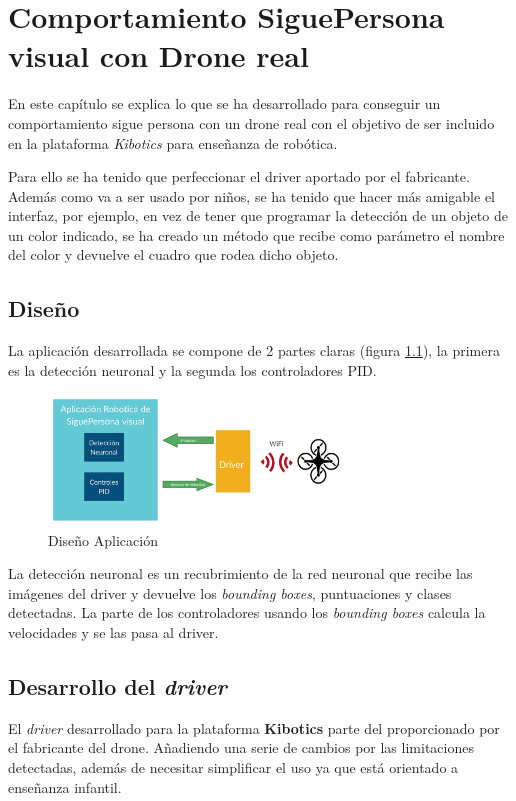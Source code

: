 \chapter{Comportamiento SiguePersona visual con Drone real}\label{cap.real}
En este capítulo se explica lo que se ha desarrollado para conseguir un comportamiento sigue persona con un drone real con el objetivo de ser incluido en la plataforma \textit{Kibotics} para enseñanza de robótica.

Para ello se ha tenido que perfeccionar el driver aportado por el fabricante\cite{tellodriver}. Además como va a ser usado por niños, se ha tenido que hacer más amigable el interfaz, por ejemplo, en vez de tener que programar la detección de un objeto de un color indicado, se ha creado un método que recibe como parámetro el nombre del color y devuelve el cuadro que rodea dicho objeto.

\section{Diseño}
La aplicación desarrollada se compone de 2 partes claras (figura \ref{fig:esquemaReal}), la primera es la detección neuronal y la segunda los controladores PID.
\begin{figure}[H]
  \begin{center}
    \includegraphics[width=0.7\textwidth]{figures/real/esquema.png}
		\caption{Diseño Aplicación}
		\label{fig:esquemaReal}
		\end{center}
\end{figure}

La detección neuronal es un recubrimiento de la red neuronal que recibe las imágenes del driver y devuelve los \textit{bounding boxes}, puntuaciones y clases detectadas. 
La parte de los controladores usando los \textit{bounding boxes} calcula la velocidades y se las pasa al driver.
\section{Desarrollo del \textit{driver}}
El \textit{driver} desarrollado para la plataforma \textbf{Kibotics} parte del proporcionado por el fabricante del drone. Añadiendo una serie de cambios por las limitaciones detectadas, además de necesitar simplificar el uso ya que está orientado a enseñanza infantil. 

